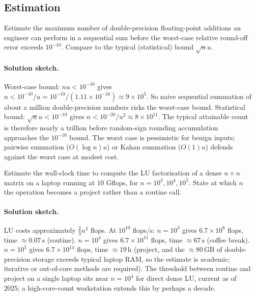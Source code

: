 \subsection*{Estimation}

\begin{exercise}
Estimate the maximum number of double-precision floating-point
additions an engineer can perform in a sequential sum before the
worst-case relative round-off error exceeds $10^{-10}$. Compare
to the typical (statistical) bound $\sqrt{n} u$.
\end{exercise}

\paragraph{Solution sketch.}
Worst-case bound: $n u < 10^{-10}$ gives $n < 10^{-10}/u
= 10^{-10}/(1.11 \times 10^{-16}) \approx 9 \times 10^{5}$. So
naive sequential summation of about a million double-precision
numbers risks the worst-case bound. Statistical bound:
$\sqrt{n} u < 10^{-10}$ gives $n < 10^{-20}/u^{2} \approx
8 \times 10^{11}$. The typical attainable count is therefore
nearly a trillion before random-sign rounding accumulation
approaches the $10^{-10}$ bound. The worst case is pessimistic
for benign inputs; pairwise summation
($O(\log n) u$) or Kahan summation
($O(1) u$) defends against the worst case at modest cost.

\begin{exercise}
Estimate the wall-clock time to compute the LU factorisation of a
dense $n \times n$ matrix on a laptop running at $10$ Gflops, for
$n = 10^{3}, 10^{4}, 10^{5}$. State at which $n$ the operation
becomes a project rather than a routine call.
\end{exercise}

\paragraph{Solution sketch.}
LU costs approximately $\frac{2}{3} n^{3}$ flops. At $10^{10}$
flops/s: $n = 10^{3}$ gives $6.7 \times 10^{8}$ flops, time
$\approx 0.07 \,\text{s}$ (routine). $n = 10^{4}$ gives
$6.7 \times 10^{11}$ flops, time $\approx 67 \,\text{s}$
(coffee break). $n = 10^{5}$ gives $6.7 \times 10^{14}$ flops, time
$\approx 19 \,\text{h}$ (project, and the $\approx 80 \,\text{GB}$
of double-precision storage exceeds typical laptop RAM, so the
estimate is academic; iterative or out-of-core methods are
required). The threshold between routine and project on a single
laptop sits near $n = 10^{4}$ for direct dense LU, current as of
2025; a high-core-count workstation extends this by perhaps a
decade.

